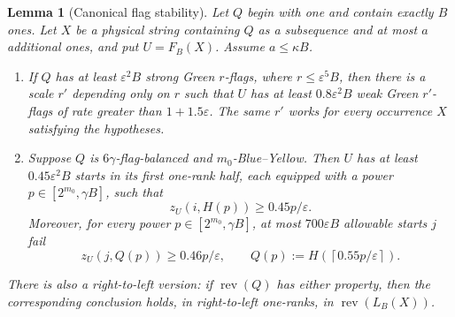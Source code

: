 \documentclass[11pt]{article}
\newtheorem{lemma}[lemma]{Lemma}
\theoremstyle{remark}
\newcommand{\rev}{\operatorname{rev}}
\newcommand{\eps}{\varepsilon}
\begin{document}
\begin{lemma}[Canonical flag stability]\label{lem:canonical-stability}
Let $Q$ begin with one and contain exactly $B$ ones.  Let $X$ be a physical
string containing $Q$ as a subsequence and at most $a$ additional ones, and
put $U=F_B(X)$.  Assume $a\le\kappa B$.
\begin{enumerate}[label=(\alph*)]
\item If $Q$ has at least $\eps^2B$ strong Green $r$-flags, where
      $r\le\eps^5B$, then there is a scale $r'$ depending only on $r$ such
      that $U$ has at least $0.8\eps^2B$ weak Green $r'$-flags of rate
      greater than $1+1.5\eps$.  The same $r'$ works for every occurrence
      $X$ satisfying the hypotheses.
\item Suppose $Q$ is $6\gamma$-flag-balanced and $m_0$-Blue--Yellow.  Then
      $U$ has at least $0.45\eps^2B$ starts in its first one-rank half, each
      equipped with a power
      $p\in[2^{m_0},\gamma B]$, such that
      \begin{equation}\label{eq:weak-blue}
       z_U(i,H(p))\ge 0.45p/\eps.
      \end{equation}
      Moreover, for every power $p\in[2^{m_0},\gamma B]$, at most
      $700\eps B$ allowable
      starts $j$ fail
      \begin{equation}\label{eq:weak-yellow}
       z_U(j,Q(p))\ge0.46p/\eps,
       \qquad
       Q(p):=H\!\left(\left\lceil0.55p/\eps\right\rceil\right).
      \end{equation}
\end{enumerate}
There is also a right-to-left version: if $\rev(Q)$ has either property,
then the corresponding conclusion holds, in right-to-left one-ranks, in
$\rev(L_B(X))$.
\end{lemma}
\end{document}
